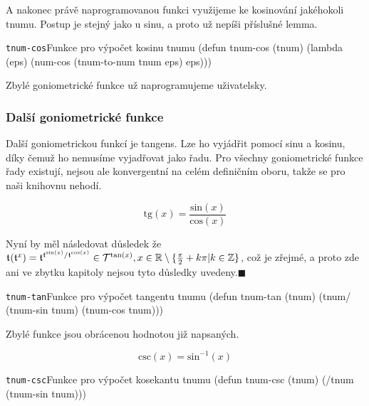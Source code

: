 A nakonec právě naprogramovanou funkci využijeme ke kosinování jakéhokoli tnumu. Postup je stejný jako u sinu, a proto už nepíši příslušné lemma.

\begin{lispcode}{\texttt{tnum-cos}}{Funkce pro výpočet kosinu tnumu}
(\textcolor{funkcionalni}{defun} \textcolor{pojmenovan}{tnum-cos} (tnum)
  (\textcolor{funkcionalni}{lambda} (eps)
    (\textcolor{moje}{num-cos} (\textcolor{moje}{tnum-to-num} tnum eps) eps)))
\end{lispcode}

Zbylé goniometrické funkce už naprogramujeme uživatelsky.

\subsubsection{Další goniometrické funkce}
Další goniometrickou funkcí je tangens. Lze ho vyjádřit pomocí sinu a kosinu, díky čemuž ho nemusíme vyjadřovat jako řadu. Pro všechny goniometrické funkce řady existují, nejsou ale konvergentní na celém definičním oboru, takže se pro naši knihovnu nehodí.
\begin{fact}
\begin{equation}
\mathrm{tg}(x)=\frac{\mathrm{sin}(x)}{\mathrm{cos}(x)}
\end{equation}
\end{fact}

\begin{convention}
Nyní by měl následovat důsledek že $\mathfrak{t}^{}(\mathfrak{t}^{x})=\mathfrak{t}^{\mathfrak{t}^{\mathrm{sin}(x)}/\mathfrak{t}^{\mathrm{cos}(x)}}\in\mathcal{T}^{\mathrm{tan}(x)},x\in\mathbb{R}\setminus\{\frac{\pi}{2}+k\pi|k\in\mathbb{Z}\}$, což je zřejmé, a proto zde ani ve zbytku kapitoly nejsou tyto důsledky uvedeny.\hfill$\blacksquare$
\end{convention}

\begin{lispcode}{\texttt{tnum-tan}}{Funkce pro výpočet tangentu tnumu}
(\textcolor{funkcionalni}{defun} \textcolor{pojmenovan}{tnum-tan} (tnum)
  (\textcolor{moje}{tnum/} (\textcolor{moje}{tnum-sin} tnum) (\textcolor{moje}{tnum-cos} tnum)))
\end{lispcode}

Zbylé funkce jsou obrácenou hodnotou již napsaných.

\begin{fact}
  \begin{equation}
    \mathrm{csc}(x)=\mathrm{sin}^{-1}(x)
  \end{equation}
\end{fact}
\begin{lispcode}{\texttt{tnum-csc}}{Funkce pro výpočet kosekantu tnumu}
(\textcolor{funkcionalni}{defun} \textcolor{pojmenovan}{tnum-csc} (tnum)
  (\textcolor{moje}{/tnum} (\textcolor{moje}{tnum-sin} tnum)))
\end{lispcode}

